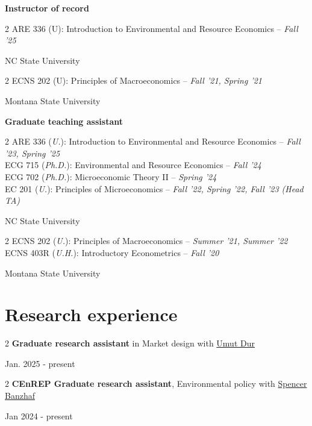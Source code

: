 \documentclass[11pt]{article}
\newenvironment{twocolentry}[2][]{
	\onecolentry
	\def\secondColumn{#2}
	\setcolumnwidth{\fill, 4.5 cm}
	\begin{paracol}{2}
	}{
		\switchcolumn \raggedleft \secondColumn
	\end{paracol}
	\endonecolentry
} %
\begin{document}
\textbf{Instructor of record}

\begin{twocolentry}{NC State University}\footnotesize
	ARE 336 (U): Introduction to Environmental and Resource Economics
	-- \textit{Fall '25}
\end{twocolentry}
\begin{twocolentry}{Montana State University}\footnotesize
	ECNS 202 (U): Principles of Macroeconomics
	-- \textit{Fall '21, Spring '21}
\end{twocolentry}

\vspace{0.10 cm}

\textbf{Graduate teaching assistant}

\begin{twocolentry}{NC State University}\footnotesize
	ARE 336 (\textit{U.}): Introduction to Environmental and Resource Economics
	-- \textit{Fall '23, Spring '25} \\
	ECG 715 (\textit{Ph.D.}): Environmental and Resource Economics
	-- \textit{Fall '24} \\
	ECG 702 (\textit{Ph.D.}): Microeconomic Theory II
	-- \textit{Spring '24} \\
	EC 201 (\textit{U.}): Principles of Microeconomics
	-- \textit{Fall '22, Spring '22, Fall '23 (Head TA)}
\end{twocolentry}
\begin{twocolentry}{Montana State University}\footnotesize
	ECNS 202 (\textit{U.}): Principles of Macroeconomics
	-- \textit{Summer '21, Summer '22} \\
	ECNS 403R (\textit{U.H.}): Introductory Econometrics
	-- \textit{Fall '20}
\end{twocolentry}

\section{Research experience}

\begin{twocolentry}{Jan. 2025 - present}\footnotesize
	\textbf{Graduate research assistant} in Market design with \href{https://sites.google.com/site/umutdur/home}{Umut Dur}
\end{twocolentry}

\begin{twocolentry}{Jan 2024 - present}\footnotesize
	\textbf{CEnREP Graduate research assistant},
	Environmental policy with \href{https://spencerbanzhaf.wordpress.ncsu.edu/}{Spencer Banzhaf}
\end{twocolentry}
\end{document}
